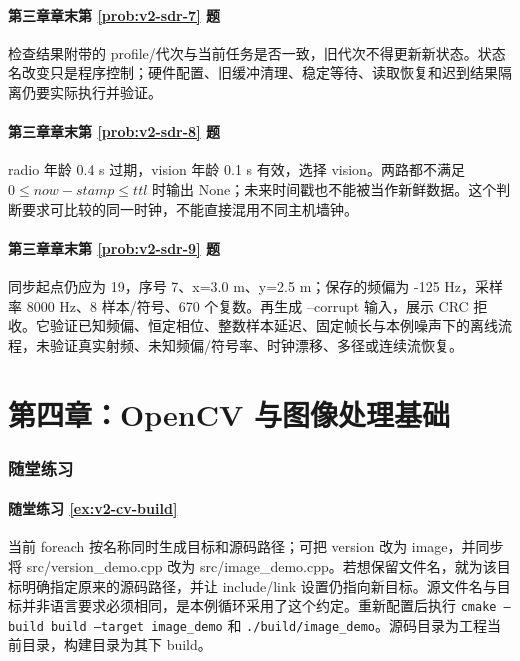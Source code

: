 \paragraph*{第三章章末第 \ref{prob:v2-sdr-7} 题}
\begin{solution}
检查结果附带的 profile/代次与当前任务是否一致，旧代次不得更新新状态。状态名改变只是程序控制；硬件配置、旧缓冲清理、稳定等待、读取恢复和迟到结果隔离仍要实际执行并验证。
\end{solution}
\paragraph*{第三章章末第 \ref{prob:v2-sdr-8} 题}
\begin{solution}
radio 年龄 0.4 s 过期，vision 年龄 0.1 s 有效，选择 vision。两路都不满足 $0\leq now-stamp\leq ttl$ 时输出 None；未来时间戳也不能被当作新鲜数据。这个判断要求可比较的同一时钟，不能直接混用不同主机墙钟。
\end{solution}
\paragraph*{第三章章末第 \ref{prob:v2-sdr-9} 题}
\begin{solution}
同步起点仍应为 19，序号 7、x=3.0 m、y=2.5 m；保存的频偏为 -125 Hz，采样率 8000 Hz、8 样本/符号、670 个复数。再生成 --corrupt 输入，展示 CRC 拒收。它验证已知频偏、恒定相位、整数样本延迟、固定帧长与本例噪声下的离线流程，未验证真实射频、未知频偏/符号率、时钟漂移、多径或连续流恢复。
\end{solution}

\section*{第四章：OpenCV 与图像处理基础}
{}
\subsubsection*{随堂练习}
\paragraph*{随堂练习 \ref{ex:v2-cv-build}}
\begin{solution}
当前 foreach 按名称同时生成目标和源码路径；可把 version 改为 image，并同步将 src/version\_demo.cpp 改为 src/image\_demo.cpp。若想保留文件名，就为该目标明确指定原来的源码路径，并让 include/link 设置仍指向新目标。源文件名与目标并非语言要求必须相同，是本例循环采用了这个约定。重新配置后执行 \texttt{cmake --build build --target image\_demo} 和 \texttt{./build/image\_demo}。源码目录为工程当前目录，构建目录为其下 build。
\end{solution}
